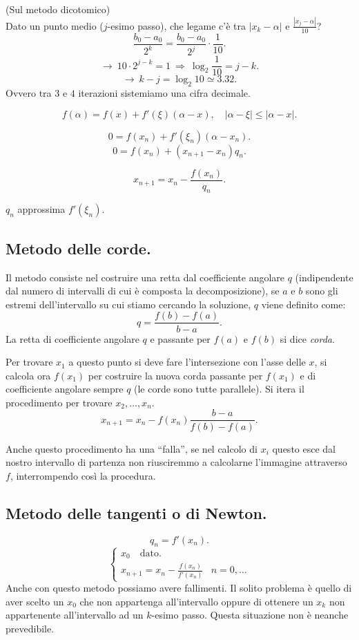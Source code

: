 \begin{osse}(Sul metodo dicotomico)\\

Dato un punto medio ($j$-esimo passo), che legame c'è tra $|x_k - \alpha|$ e 
$\frac{|x_j-\alpha|}{10}$?
\[
\frac{b_0 - a_0}{2^k} = \frac{b_0 - a_0}{2^j} \cdot \frac{1}{10}.
\]
\[\longrightarrow \
10 \cdot 2^{j-k} = 1\ \Longrightarrow \ \log_2\frac{1}{10} = j-k.
\]
\[\longrightarrow \
k-j = \log_2 10 \simeq 3.32.
\]
Ovvero tra $3$ e $4$ iterazioni sistemiamo una cifra decimale.
\end{osse}

\[
f(\alpha) = f(x) + f'(\xi)(\alpha-x), \quad |\alpha - \xi| \leq |\alpha -x|.
\]

\[
0 = f(x_n) + f'(\xi_n)(\alpha -x_n).
\]
\[
0 = f(x_n) + (x_{n+1} - x_n)q_n.
\]

\[
x_{n+1} = x_n - \frac{f(x_n)}{q_n}.
\]

$q_n$ approssima $f'(\xi_n)$.

\subsection{Metodo delle corde.}
Il metodo consiste nel costruire una retta dal coefficiente angolare $q$
(indipendente dal numero di intervalli di cui è composta la decomposizione),
se $a$ e $b$ sono gli estremi dell'intervallo su cui stiamo cercando la
soluzione, $q$ viene definito come:
\[
q = \frac{f(b)-f(a)}{b-a}.
\]
La retta di  coefficiente angolare $q$ e passante per $f(a)$ e $f(b)$ si dice
\emph{corda}.

Per trovare $x_1$ a questo punto si deve fare l'intersezione con l'asse delle
$x$, si calcola ora $f(x_1)$ per costruire la nuova corda passante per 
$f(x_1)$ e di coefficiente angolare sempre $q$ (le corde sono tutte 
parallele). Si itera il procedimento per trovare $x_2, \ldots, x_n$.
\[x_{n+1} = x_n - f(x_n)\frac{b-a}{f(b)-f(a)}.\]

\begin{osse}
Anche questo procedimento ha una ``falla'', se nel calcolo di $x_i$ questo
esce dal nostro intervallo di partenza non riusciremmo a calcolarne 
l'immagine attraverso $f$, interrompendo così la procedura.
\end{osse}

\subsection{Metodo delle tangenti o di Newton.}
\[q_n = f'(x_n).\]
\[\left\{\begin{array}{lr}
x_0 \quad \textrm{dato.} \\
x_{n+1} = x_n - \frac{f(x_n)}{f'(x_n)} & n = 0,\ldots
\end{array}\right.\]
Anche con questo metodo possiamo avere fallimenti. Il solito problema è
quello di aver scelto un $x_0$ che non appartenga all'intervallo oppure
di ottenere un $x_k$ non appartenente all'intervallo ad un $k$-esimo passo.
Questa situazione non è neanche prevedibile.


